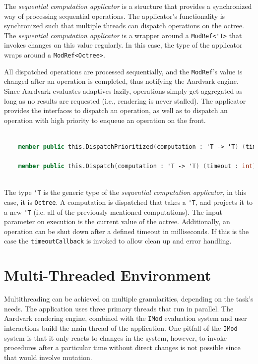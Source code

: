 The \textit{sequential computation applicator} is a structure that provides a synchronized way of processing sequential operations. The applicator's functionality is synchronized such that multiple threads can dispatch operations on the octree. The \textit{sequential computation applicator} is a wrapper around a \verb|ModRef<'T>| that invokes changes on this value regularly. 
In this case, the type of the applicator wraps around a \verb|ModRef<Octree>|. 

All dispatched operations are processed sequentially, and the \verb|ModRef|'s value is changed after an operation is completed, thus notifying the Aardvark engine. Since Aardvark evaluates adaptives lazily, operations simply get aggregated as long as no results are requested (i.e., rendering is never stalled). 
The applicator provides the interfaces to dispatch an operation, as well as to dispatch an operation with high priority to enqueue an operation on the front. 

\begin{lstlisting}[language = FSharp]

    member public this.DispatchPrioritized(computation : 'T -> 'T) (timeout : int) (timeoutCallback  : unit -> unit) : unit = ...

    member public this.Dispatch(computation : 'T -> 'T) (timeout : int) (timeoutCallback  : unit -> unit) : unit = ...
   
\end{lstlisting}

The type \verb|'T| is the generic type of the \textit{sequential computation applicator}, in this case, it is \verb|Octree|. A computation is dispatched that takes a \verb|'T|, and projects it to a new \verb|'T| (i.e. all of the previously mentioned computations). The input parameter on execution is the current value of the octree. Additionally, an operation can be shut down after a defined timeout in milliseconds. If this is the case the \verb|timeoutCallback| is invoked to allow clean up and error handling. 


\section{Multi-Threaded Environment}
\label {sec:multithreading}

Multithreading can be achieved on multiple granularities, depending on the task's needs. The application uses three primary threads that run in parallel. The Aardvark rendering engine, combined with the \verb|IMod| evaluation system and user interactions build the main thread of the application. One pitfall of the \verb|IMod| system is that it only reacts to changes in the system, however, to invoke procedures after a particular time without direct changes is not possible since that would involve mutation.

